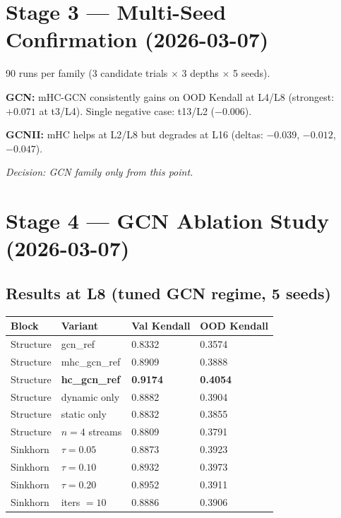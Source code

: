 \documentclass[11pt,a4paper]{article}
\begin{document}
\section{Stage 3 --- Multi-Seed Confirmation (2026-03-07)}

90 runs per family (3 candidate trials $\times$ 3 depths $\times$ 5 seeds).

\textbf{GCN:} mHC-GCN consistently gains on OOD Kendall at L4/L8
(strongest: $+0.071$ at t3/L4). Single negative case: t13/L2 ($-0.006$).

\textbf{GCNII:} mHC helps at L2/L8 but degrades at L16
(deltas: $-0.039$, $-0.012$, $-0.047$).

\textit{Decision: GCN family only from this point.}

\section{Stage 4 --- GCN Ablation Study (2026-03-07)}

\subsection{Results at L8 (tuned GCN regime, 5 seeds)}
\begin{table}[h]
\centering
\begin{tabular}{L{3.5cm} L{3.5cm} R{2.5cm} R{2.5cm}}
\toprule
Block & Variant & Val Kendall & OOD Kendall \\
\midrule
Structure & gcn\_ref          & 0.8332 & 0.3574 \\
Structure & mhc\_gcn\_ref     & 0.8909 & 0.3888 \\
Structure & \textbf{hc\_gcn\_ref} & \textbf{0.9174} & \textbf{0.4054} \\
Structure & dynamic only      & 0.8882 & 0.3904 \\
Structure & static only       & 0.8832 & 0.3855 \\
Structure & $n=4$ streams     & 0.8809 & 0.3791 \\
\midrule
Sinkhorn  & $\tau=0.05$       & 0.8873 & 0.3923 \\
Sinkhorn  & $\tau=0.10$       & 0.8932 & 0.3973 \\
Sinkhorn  & $\tau=0.20$       & 0.8952 & 0.3911 \\
Sinkhorn  & iters $=10$       & 0.8886 & 0.3906 \\
\bottomrule
\end{tabular}
\end{table}
\end{document}
